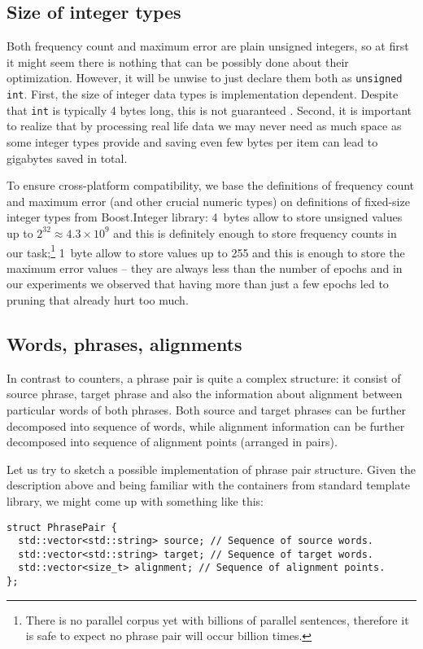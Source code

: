 \subsection{Size of integer types}

Both frequency count and maximum error are plain unsigned integers, so at first it might seem
there is nothing that can be possibly done about their optimization.
However, it will be unwise to just declare them both as \verb|unsigned int|.
First, the size of integer data types is implementation dependent.
Despite that \verb|int| is typically 4 bytes long, this is not guaranteed \citep[Chapter 4.6]{stroustrup:cplusplus}.
Second, it is important to realize that by processing real life data we may never need as much
space as some integer types provide and saving even few bytes per item can lead to gigabytes
saved in total.

To ensure cross-platform compatibility, we base the definitions of frequency count and maximum
error (and other crucial numeric types) on definitions of fixed-size integer types from Boost.Integer
library:
4~bytes allow to store unsigned values up to $2^{32} \approx 4.3 \times 10^9$ and this is definitely
enough to store frequency counts in our task;\footnote{There is no parallel corpus yet with billions
of parallel sentences, therefore it is safe to expect no phrase pair will occur billion times.}
1~byte allow to store values up to 255 and this is enough to store the maximum error values
-- they are always less than the number of epochs and in our experiments we observed that having
more than just a few epochs led to pruning that already hurt too much.

\subsection{Words, phrases, alignments}


In contrast to counters, a phrase pair is quite a complex structure: it consist of source phrase,
target phrase and also the information about alignment between particular words of both phrases.
Both source and target phrases can be further decomposed into sequence of words, while alignment
information can be further decomposed into sequence of alignment points (arranged in pairs).

Let us try to sketch a possible implementation of phrase pair structure.
Given the description above and being familiar with the containers from standard
template library, we might come up with something like this:
\begin{verbatim}
struct PhrasePair {
  std::vector<std::string> source; // Sequence of source words.
  std::vector<std::string> target; // Sequence of target words.
  std::vector<size_t> alignment; // Sequence of alignment points.
};
\end{verbatim}

